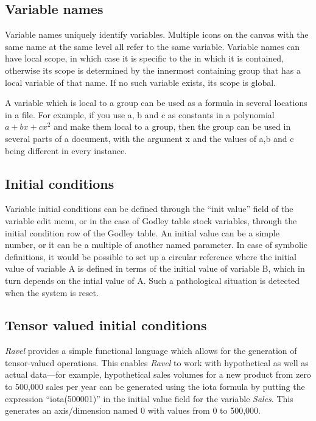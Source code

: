 \subsection{Variable names}

Variable names uniquely identify variables. Multiple icons on the
canvas with the same name at the same level all refer to the same
variable. Variable names can have local scope, in which case it
is specific to the  in which it is contained,
otherwise its scope is determined by the innermost containing group
that has a local variable of that name. If no such variable exists,
its scope is global.

A variable which is local to a group can be used as a formula in
several locations in a file. For example, if you use a, b and c as
constants in a polynomial $a+bx+cx^{2}$ and make them local to a
group, then the group can be used in several parts of a document, with
the argument x and the values of a,b and c being different in every
instance.

\subsection{Initial conditions}

\label{var:init}

Variable initial conditions can be defined through the ``init value''
field of the variable edit menu, or in the case of Godley table stock
variables, through the initial condition row of the Godley table.
An initial value can be a simple number, or it can be a multiple of
another named parameter. In case of symbolic definitions, it would
be possible to set up a circular reference where the initial value
of variable A is defined in terms of the initial value of variable
B, which in turn depends on the intial value of A. Such a pathological
situation is detected when the system is reset.

\subsection{Tensor valued initial conditions}

\label{tensor-init}

\emph{Ravel} provides a simple functional language which allows for
the generation of tensor-valued operations. This enables \emph{Ravel}
to work with hypothetical as well as actual data---for example, hypothetical
sales volumes for a new product from zero to 500,000 sales per year
can be generated using the iota formula by putting the expression
``iota(500001)'' in the initial value field for the variable \emph{Sales}.
This generates an axis/dimension named 0 with values from 0 to 500,000. 

